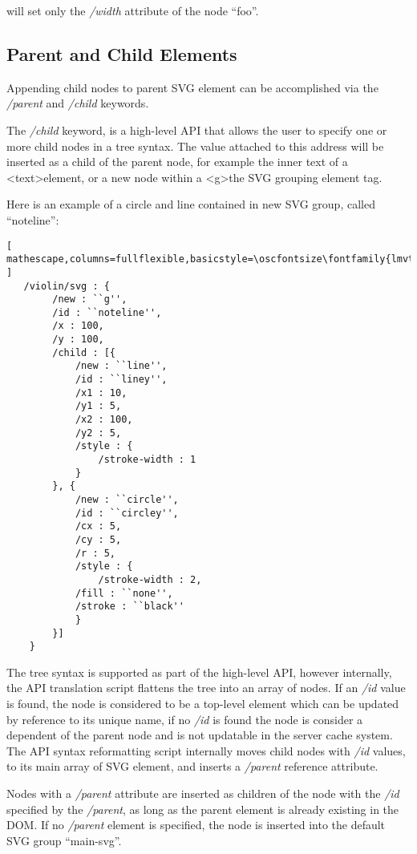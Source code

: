 \noindent
will set only the \textit{/width} attribute of the node ``foo''.

\subsection{Parent and Child Elements}\label{sec:parent}
Appending child nodes to parent SVG element can be accomplished via the \textit{/parent} and \textit{/child} keywords.

The \textit{/child} keyword, is a high-level API that allows the user to specify one or more child nodes in a tree syntax.
The value attached to this address will be inserted as a child of the parent node, for example the inner text of a \textless text\textgreater element, or a new node within a \textless g\textgreater the SVG grouping element tag.

Here is an example of a circle and line contained in new SVG group, called ``noteline'':

\begin{lstlisting}[ mathescape,columns=fullflexible,basicstyle=\oscfontsize\fontfamily{lmvtt}\selectfont ]
   /violin/svg : {
        /new : ``g'',
        /id : ``noteline'',
        /x : 100,
        /y : 100,
        /child : [{
      	    /new : ``line'',
            /id : ``liney'',
      	    /x1 : 10,
      	    /y1 : 5,
      	    /x2 : 100,
      	    /y2 : 5,
      	    /style : {
      	        /stroke-width : 1
      	    }
      	}, {
      	    /new : ``circle'',
            /id : ``circley'',
      	    /cx : 5,
      	    /cy : 5,
      	    /r : 5,
      	    /style : {
      	        /stroke-width : 2,
      		/fill : ``none'',
      		/stroke : ``black''
      	    }
        }]
    }
\end{lstlisting}

The tree syntax is supported as part of the high-level API, however internally, the API translation script flattens the tree into an array of nodes. 
If an \textit{/id} value is found, the node is considered to be a top-level element which can be updated by reference to its unique name, if no \textit{/id} is found the node is consider a dependent of the parent node and is not updatable in the server cache system.
The API syntax reformatting script internally moves child nodes with \textit{/id} values, to its main array of SVG element, and inserts a \textit{/parent} reference attribute.

Nodes with a \textit{/parent} attribute are inserted as children of the node with the \textit{/id} specified by the \textit{/parent}, as long as the parent element is already existing in the DOM.
If no \textit{/parent} element is specified, the node is inserted into the default SVG group ``main-svg''.

